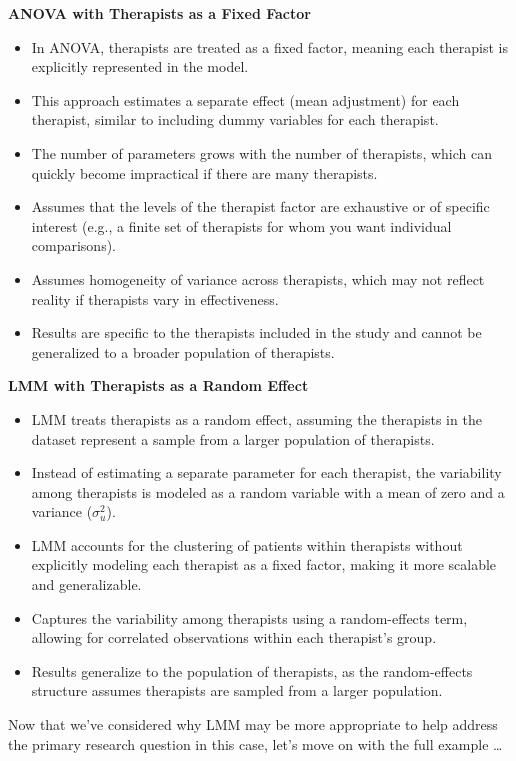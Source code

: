 \noindent \textbf{ANOVA with Therapists as a Fixed Factor}
\begin{itemize}
\item In ANOVA, therapists are treated as a fixed factor, meaning each therapist is explicitly represented in the model.
\item This approach estimates a separate effect (mean adjustment) for each therapist, similar to including dummy variables for each therapist.
\item The number of parameters grows with the number of therapists, which can quickly become impractical if there are many therapists.
\item Assumes that the levels of the therapist factor are exhaustive or of specific interest (e.g., a finite set of therapists for whom you want individual comparisons).
\item Assumes homogeneity of variance across therapists, which may not reflect reality if therapists vary in effectiveness.
\item Results are specific to the therapists included in the study and cannot be generalized to a broader population of therapists.
\end{itemize}
\noindent \textbf{LMM with Therapists as a Random Effect}
\begin{itemize}
\item LMM treats therapists as a random effect, assuming the therapists in the dataset represent a sample from a larger population of therapists.
\item Instead of estimating a separate parameter for each therapist, the variability among therapists is modeled as a random variable with a mean of zero and a variance ($\sigma_u^2$).
\item LMM accounts for the clustering of patients within therapists without explicitly modeling each therapist as a fixed factor, making it more scalable and generalizable.
\item Captures the variability among therapists using a random-effects term, allowing for correlated observations within each therapist's group.
\item Results generalize to the population of therapists, as the random-effects structure assumes therapists are sampled from a larger population.
\end{itemize}

Now that we've considered why LMM may be more appropriate to help address the primary research question in this case, let's move on with the full example \dots

